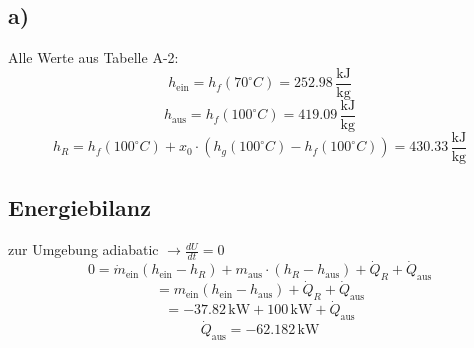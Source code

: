 

\subsection*{a)}
Alle Werte aus Tabelle A-2:
\[
h_{\text{ein}} = h_f(70^\circ C) = 252.98 \, \frac{\text{kJ}}{\text{kg}}
\]
\[
h_{\text{aus}} = h_f(100^\circ C) = 419.09 \, \frac{\text{kJ}}{\text{kg}}
\]
\[
h_R = h_f(100^\circ C) + x_0 \cdot (h_g(100^\circ C) - h_f(100^\circ C)) = 430.33 \, \frac{\text{kJ}}{\text{kg}}
\]

\subsection*{Energiebilanz}
zur Umgebung adiabatic $\rightarrow \frac{dU}{dt} = 0$
\[
0 = \dot{m}_{\text{ein}} (h_{\text{ein}} - h_R) + m_{\text{aus}} \cdot (h_R - h_{\text{aus}}) + \dot{Q}_R + \dot{Q}_{\text{aus}}
\]
\[
= m_{\text{ein}} (h_{\text{ein}} - h_{\text{aus}}) + \dot{Q}_R + \dot{Q}_{\text{aus}}
\]
\[
= -37.82 \, \text{kW} + 100 \, \text{kW} + \dot{Q}_{\text{aus}}
\]
\[
\dot{Q}_{\text{aus}} = -62.182 \, \text{kW}
\]